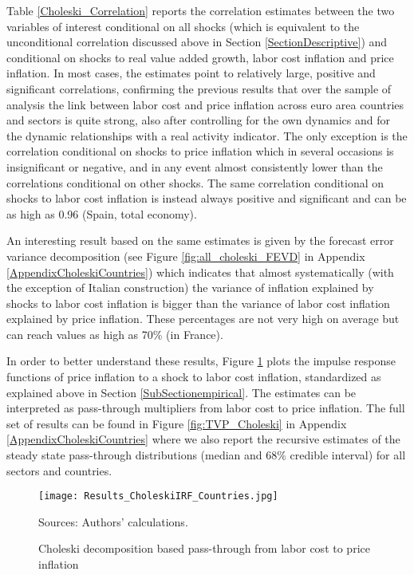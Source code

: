 \documentclass[11pt]{article}
\begin{document}
Table \ref{Choleski_Correlation} reports the correlation estimates between the two variables of interest conditional on all shocks (which is equivalent to the unconditional correlation discussed above in Section \ref{SectionDescriptive}) and conditional on shocks to real value added growth, labor cost inflation and price inflation. In most cases, the estimates point to relatively large, positive and significant correlations, confirming the previous results that over the sample of analysis the link between labor cost and price inflation across euro area countries and sectors is quite strong, also after controlling for the own dynamics and for the dynamic relationships with a real activity indicator. The only exception is the correlation conditional on shocks to price inflation which in several occasions is insignificant or negative, and in any event almost consistently lower than the correlations conditional on other shocks. The same correlation conditional on shocks to labor cost inflation is instead always positive and significant and can be as high as 0.96 (Spain, total economy). 

An interesting result based on the same estimates is given by the forecast error variance decomposition (see Figure \ref{fig:all_choleski_FEVD} in Appendix \ref{AppendixCholeskiCountries}) which indicates that almost systematically (with the exception of Italian construction) the variance of inflation explained by shocks to labor cost inflation is bigger than the variance of labor cost inflation explained by price inflation. These percentages are not very high on average but can reach values as high as 70\% (in France).

In order to better understand these results, Figure \ref{fig:Figure_CholeskiIRF_Countries} plots the impulse response functions of price inflation to a shock to labor cost inflation, standardized as explained above in Section \ref{SubSectionempirical}. The estimates can be interpreted as pass-through multipliers from labor cost to price inflation. The full set of results can be found in Figure \ref{fig:TVP_Choleski} in Appendix \ref{AppendixCholeskiCountries} where we also report the recursive estimates of the steady state pass-through distributions (median and 68\% credible interval) for all sectors and countries.

\begin{figure}[!htbp]
\begin{center}
\caption{Choleski decomposition based pass-through from labor cost to price inflation}\label{fig:Figure_CholeskiIRF_Countries}
\texttt{[image: Results\_CholeskiIRF\_Countries.jpg]}
\begin{minipage}{\textwidth} {\footnotesize
Sources: Authors' calculations.\par}
\end{minipage}
\end{center}
\end{figure}
\end{document}
